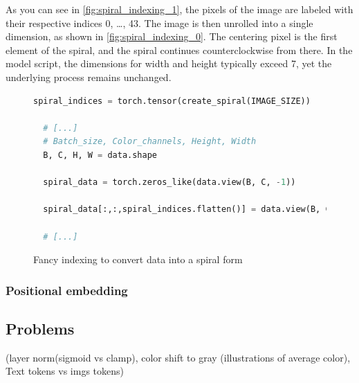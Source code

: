     As you can see in \autoref{fig:spiral_indexing_1}, the pixels of the image are labeled with their respective indices 0, \dots, 43. The image is then unrolled into a single dimension, as shown in \autoref{fig:spiral_indexing_0}. The centering pixel is the first element of the spiral, and the spiral continues counterclockwise from there. In the model script, the dimensions for width and height typically exceed 7, yet the underlying process remains unchanged.

\begin{figure}[H]
\centering
\begin{lstlisting}[language=Python]
  spiral_indices = torch.tensor(create_spiral(IMAGE_SIZE))

  # [...]
  # Batch_size, Color_channels, Height, Width
  B, C, H, W = data.shape

  spiral_data = torch.zeros_like(data.view(B, C, -1))

  spiral_data[:,:,spiral_indices.flatten()] = data.view(B, C, -1)

  # [...]
\end{lstlisting}
\caption{Fancy indexing to convert data into a spiral form}
\label{fig:spiral_indexing_code}
\end{figure}

    \subsubsection{Positional embedding}

\subsection{Problems}
    (layer norm(sigmoid vs clamp), color shift to gray (illustrations of average color), Text tokens vs imgs tokens)